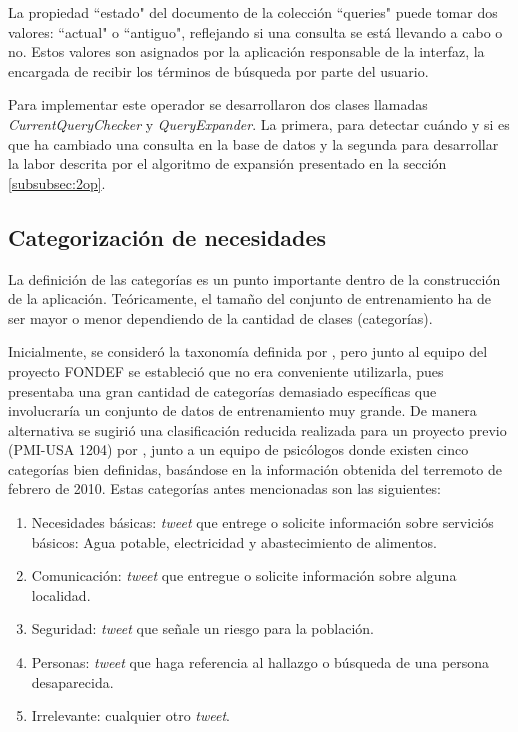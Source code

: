 La propiedad ``estado" del documento de la colección ``queries" puede tomar dos valores: ``actual" o ``antiguo", reflejando si una consulta se está llevando a cabo o no. Estos valores son asignados por la aplicación responsable de la interfaz, la encargada de recibir los términos de búsqueda por parte del usuario.

Para implementar este operador se desarrollaron dos clases llamadas \textit{CurrentQueryChecker} y \textit{QueryExpander}. La primera, para detectar cuándo y si es que ha cambiado una consulta en la base de datos y la segunda para desarrollar la labor descrita por el algoritmo de expansión presentado en la sección \ref{subsubsec:2op}.

\subsection{Categorización de necesidades}
\label{sec:diseno:categorias}

La definición de las categorías es un punto importante dentro de la construcción de la aplicación. Teóricamente, el tamaño del conjunto de entrenamiento ha de ser mayor o menor dependiendo de la cantidad de clases (categorías). 

Inicialmente, se consideró la taxonomía definida por \citep{TaxonomiaChato}, pero junto al equipo del proyecto FONDEF se estableció que no era conveniente utilizarla, pues presentaba una gran cantidad de categorías demasiado específicas que involucraría un conjunto de datos de entrenamiento muy grande. De manera alternativa se sugirió una clasificación reducida realizada para un proyecto previo (PMI-USA 1204) por \citep{PMIProfes}, junto  a un equipo de psicólogos donde existen cinco categorías bien definidas, basándose en la información obtenida del terremoto de febrero de 2010. Estas categorías antes mencionadas son las siguientes: 

\begin{enumerate}
\item Necesidades básicas: \textit{tweet} que entrege o solicite información sobre serviciós básicos: Agua potable, electricidad y abastecimiento de alimentos.
\item Comunicación: \textit{tweet} que entregue o solicite información sobre alguna localidad.
\item Seguridad: \textit{tweet} que señale un riesgo para la población.
\item Personas: \textit{tweet} que haga referencia al hallazgo o búsqueda de una persona desaparecida.
\item Irrelevante: cualquier otro \textit{tweet}.
\end{enumerate}

